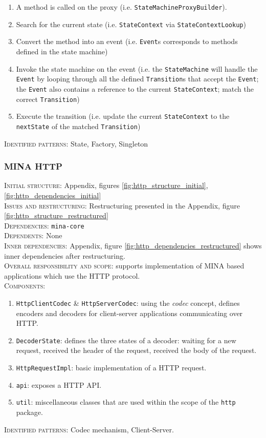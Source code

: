 \begin{enumerate}
    \item A method is called on the proxy (i.e. \texttt{StateMachineProxyBuilder}).
    \item Search for the current state (i.e. \texttt{StateContext} via  \texttt{StateContextLookup})
    \item Convert the method into an event (i.e. \texttt{Event}s corresponds to methods defined in the state machine)
    \item Invoke the state machine on the event (i.e. the \texttt{StateMachine} will handle the \texttt{Event} by looping through all the defined \texttt{Transition}s that accept the \texttt{Event}; the \texttt{Event} also contains a reference to the current \texttt{StateContext}; match the correct \texttt{Transition})
    \item Execute the transition (i.e. update the current \texttt{StateContext} to the \texttt{nextState} of the matched \texttt{Transition})
\end{enumerate}
\textsc{Identified patterns}: State, Factory, Singleton

\subsubsection{MINA HTTP}
\textsc{Initial structure}: Appendix, figures \ref{fig:http_structure_initial}, \ref{fig:http_dependencies_initial} \\
\textsc{Issues and restructuring}: Restructuring presented in the Appendix, figure \ref{fig:http_structure_restructured} \\
\textsc{Dependencies}: \texttt{mina-core}\\
\textsc{Dependents}: None\\
\textsc{Inner dependencies}: Appendix, figure \ref{fig:http_dependencies_restructured} shows inner dependencies after restructuring. \\
\textsc{Overall responsibility and scope}: supports implementation of MINA based applications which use the HTTP protocol.\\
\textsc{Components}: 
\begin{enumerate}
    \item \texttt{HttpClientCodec} \& \texttt{HttpServerCodec}: using the \textit{codec} concept, defines encoders and decoders for client-server applications communicating over HTTP.
    \item \texttt{DecoderState}: defines the three states of a decoder: waiting for a new request, received the header of the request, received the body of the request.
    \item \texttt{HttpRequestImpl}: basic implementation of a HTTP request.
    \item \texttt{api}: exposes a HTTP API.
    \item \texttt{util}: miscellaneous classes that are used within the scope of the \texttt{http} package.
\end{enumerate}
\textsc{Identified patterns}: Codec mechanism, Client-Server.\\


